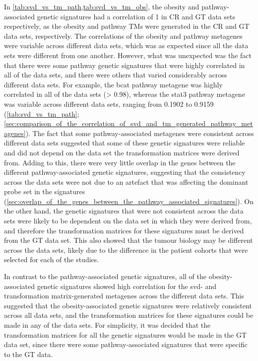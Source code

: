 In \cref{tab:svd_vs_tm_path,tab:svd_vs_tm_obs}, the obesity and pathway-associated genetic signatures had a correlation of 1 in CR and GT data sets respectively, as the obesity and pathway TMs were generated in the CR and GT data sets, respectively.
The correlations of the obesity and pathway metagenes were variable across different data sets, which was as expected since all the data sets were different from one another.
However, what was unexpected was the fact that there were some pathway genetic signatures that were highly correlated in all of the data sets, and there were others that varied considerably across different data sets.
For example, the \gls{bcat} pathway metagene was highly correlated in all of the data sets (\textgreater{} 0.98), whereas the \gls{stat3} pathway metagene was variable across different data sets, ranging from 0.1902 to 0.9159 (\cref{tab:svd_vs_tm_path}; \cref{sec:comparison_of_the_correlation_of_svd_and_tm_generated_pathway_metagenes}).
The fact that some pathway-associated metagenes were consistent across different data sets suggested that some of these genetic signatures were reliable and did not depend on the data set the transformation matrices were derived from.
Adding to this, there were very little overlap in the genes between the different pathway-associated genetic signatures, suggesting that the consistency across the data sets were not due to an artefact that was affecting the dominant probe set in the signatures (\cref{sec:overlap_of_the_genes_between_the_pathway_associated_signatures}).
On the other hand, the genetic signatures that were not consistent across the data sets were likely to be dependent on the data set in which they were derived from, and therefore the transformation matrices for these signatures must be derived from the GT data set.
This also showed that the tumour biology may be different across the data sets, likely due to the difference in the patient cohorts that were selected for each of the studies.

In contrast to the pathway-associated genetic signatures, all of the obesity-associated genetic signatures showed high correlation for the \gls{svd}- and transformation matrix-generated metagenes across the different data sets.
This suggested that the obesity-associated genetic signatures were relatively consistent across all data sets, and the transformation matrices for these signatures could be made in any of the data sets.
For simplicity, it was decided that the transformation matrices for all the genetic  signatures would be made in the GT data set, since there were some pathway-associated signatures that were specific to the GT data.

